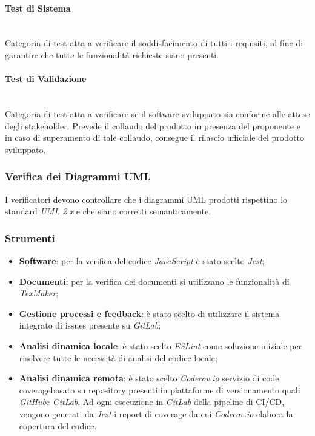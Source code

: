 \paragraph{Test di Sistema}\-\\
Categoria di test atta a verificare il soddisfacimento di tutti i requisiti, al fine di garantire che tutte le funzionalità richieste siano presenti.

\paragraph{Test di Validazione} \-\\
Categoria di test atta a verificare se il software sviluppato sia conforme alle attese degli stakeholder.  Prevede il collaudo del prodotto in presenza del proponente e in caso di superamento di tale collaudo, consegue il rilascio ufficiale del prodotto sviluppato.

\subsubsection{Verifica dei Diagrammi UML}
I verificatori devono controllare che i diagrammi UML prodotti rispettino lo standard \textit{UML 2.x} e che siano corretti semanticamente.

\subsubsection{Strumenti}
\begin{itemize}
	\item \textbf{Software}: per la verifica del codice \textit{JavaScript} è stato scelto \textit{Jest};
	\item \textbf{Documenti}: per la verifica dei documenti si utilizzano le funzionalità di \textit{TexMaker};
	\item \textbf{Gestione processi e feedback}: è stato scelto di utilizzare il sistema integrato di issues presente su \textit{GitLab};
	\item \textbf{Analisi dinamica locale}: è stato scelto \textit{ESLint} come soluzione iniziale per risolvere tutte le necessità di analisi del codice locale;
	\item \textbf{Analisi dinamica remota}:	è stato scelto \textit{Codecov.io} servizio di code coverage\glossario basato su repository presenti in piattaforme di versionamento quali \textit{GitHub}\glossario e \textit{GitLab}. Ad ogni esecuzione in \textit{GitLab} della pipeline di CI/CD, vengono generati da \textit{Jest} i report di coverage da cui \textit{Codecov.io} elabora la copertura del codice.
\end{itemize}

